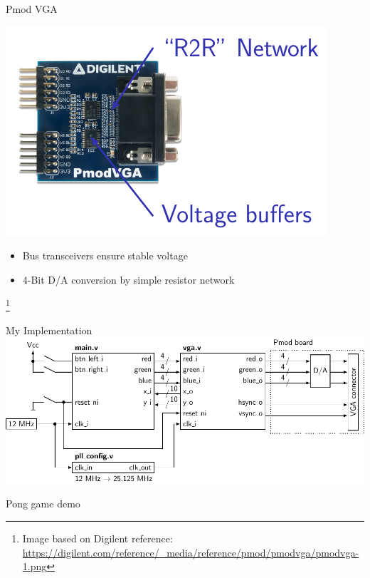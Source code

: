 \documentclass{beamer}
\begin{document}
\begin{frame}{Pmod VGA}
	\begin{minipage}{0.66\textwidth}
		\includegraphics[width=\textwidth]{../figures/pmod-figure0.pdf}
	\end{minipage}
	\begin{minipage}{0.32\textwidth}
		\begin{itemize}
			\item Bus transceivers ensure stable voltage 
			\item 4-Bit D/A conversion by simple resistor network
		\end{itemize}
	\end{minipage}
	\footnote{Image based on Digilent reference:
	\url{https://digilent.com/reference/_media/reference/pmod/pmodvga/pmodvga-1.png}}
\end{frame}

\begin{frame}{My Implementation}
	\includegraphics[width=\textwidth]{../figures/diagram-figure0.pdf}
\end{frame}

\begin{frame}{Pong game demo}
\end{frame}
\end{document}
